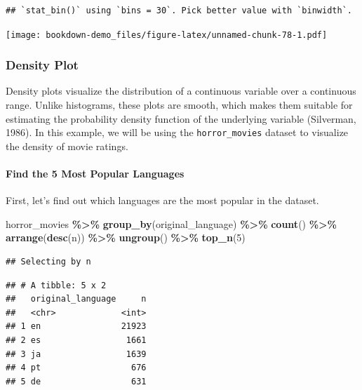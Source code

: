\documentclass[
  b5paper]{book}
\newenvironment{Shaded}{\begin{snugshade}}{\end{snugshade}}
\newcommand{\DecValTok}[1]{\textcolor[rgb]{0.00,0.00,0.81}{#1}}
\newcommand{\FunctionTok}[1]{\textcolor[rgb]{0.13,0.29,0.53}{\textbf{#1}}}
\newcommand{\NormalTok}[1]{#1}
\newcommand{\SpecialCharTok}[1]{\textcolor[rgb]{0.81,0.36,0.00}{\textbf{#1}}}
\begin{document}
\begin{verbatim}
## `stat_bin()` using `bins = 30`. Pick better value with `binwidth`.
\end{verbatim}

\texttt{[image: bookdown-demo\_files/figure-latex/unnamed-chunk-78-1.pdf]}

\hypertarget{density-plot}{%
\subsubsection*{Density Plot}\label{density-plot}}

Density plots visualize the distribution of a continuous variable over a continuous range. Unlike histograms, these plots are smooth, which makes them suitable for estimating the probability density function of the underlying variable (Silverman, 1986). In this example, we will be using the \texttt{horror\_movies} dataset to visualize the density of movie ratings.

\hypertarget{find-the-5-most-popular-languages}{%
\paragraph*{Find the 5 Most Popular Languages}\label{find-the-5-most-popular-languages}}

First, let's find out which languages are the most popular in the dataset.

\begin{Shaded}
\begin{Highlighting}[]
\NormalTok{horror\_movies }\SpecialCharTok{\%\textgreater{}\%}
  \FunctionTok{group\_by}\NormalTok{(original\_language) }\SpecialCharTok{\%\textgreater{}\%}
  \FunctionTok{count}\NormalTok{() }\SpecialCharTok{\%\textgreater{}\%}
  \FunctionTok{arrange}\NormalTok{(}\FunctionTok{desc}\NormalTok{(n)) }\SpecialCharTok{\%\textgreater{}\%}
  \FunctionTok{ungroup}\NormalTok{() }\SpecialCharTok{\%\textgreater{}\%}
  \FunctionTok{top\_n}\NormalTok{(}\DecValTok{5}\NormalTok{)}
\end{Highlighting}
\end{Shaded}

\begin{verbatim}
## Selecting by n
\end{verbatim}

\begin{verbatim}
## # A tibble: 5 x 2
##   original_language     n
##   <chr>             <int>
## 1 en                21923
## 2 es                 1661
## 3 ja                 1639
## 4 pt                  676
## 5 de                  631
\end{verbatim}
\end{document}
